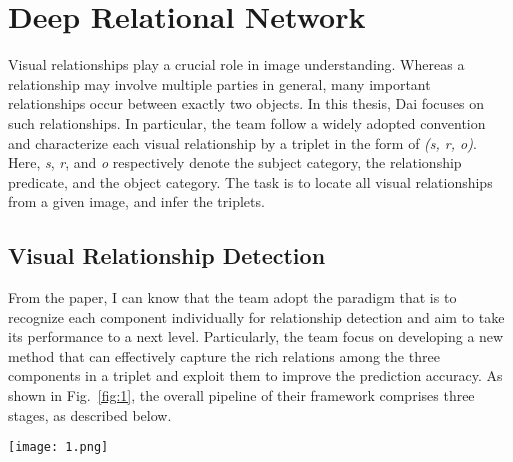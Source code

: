 \documentclass[10pt,twocolumn,letterpaper]{article}
\begin{document}
\section{Deep Relational Network}

Visual relationships play a crucial role in image understanding. Whereas a relationship may involve multiple parties in general, many important relationships occur between exactly two objects. In this thesis, Dai focuses on such relationships. In particular, the team follow a widely adopted convention \cite{Sadeghi2011Recognition} and characterize each visual relationship by a triplet in the form of \emph{(s, r, o)}. Here, \emph{s}, \emph{r}, and \emph{o} respectively denote the subject category, the relationship predicate, and the object category. The task is to locate all visual relationships from a given image, and infer the triplets.

\subsection{Visual Relationship Detection}

From the paper, I can know that the team adopt the paradigm that is to recognize each component individually for relationship detection and aim to take its performance to a next level. Particularly, the team focus on developing a new method that can effectively capture the rich relations among the three components in a triplet and exploit them to improve the prediction accuracy. As shown in Fig.~\ref{fig:1}, the overall pipeline of their framework comprises three stages, as described below.

\begin{figure*}
	\begin{center}
		\texttt{[image: 1.png]}
	\end{center}
	\caption{The proposed framework for visual relationship detection. Given an image, it first employs an object detector to locate individual objects. Each object also comes with an appearance feature. For each pair of objects, the corresponding local regions and the spatial masks will be extracted, which, together with the appearance features of individual objects, will be fed to the DR-Net. The DR-Net will jointly analyze all aspects and output $q_s$, $q_r$, and $q_o$, the predicted category probabilities for each component of the triplet. Finally, the triplet \emph{(s, r, o)} will be derived by choosing the most probable categories for each component.}
	\label{fig:1}
\end{figure*}
\end{document}
